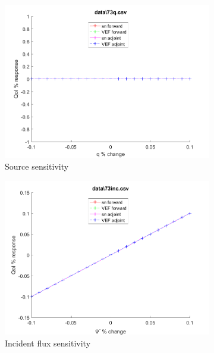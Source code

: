 \documentclass{article}
\begin{document}
\begin{figure}[H]
\label{Case73Sens}
\centering
\begin{subfigure}{.5\textwidth}
  \centering
  \includegraphics[width=.98\linewidth]{IanProposal/figures2/73qSens.png}
  \caption{Source sensitivity}
  \label{fig:sfig1}
\end{subfigure}%
\begin{subfigure}{.5\textwidth}
  \centering
  \includegraphics[width=.98\linewidth]{IanProposal/figures2/73incSens.png}
  \caption{Incident flux sensitivity}
  \label{fig:sfig4}
\end{subfigure}%
\\
\begin{subfigure}{.5\textwidth}
  \centering

\end{subfigure}
\end{figure}
\end{document}
